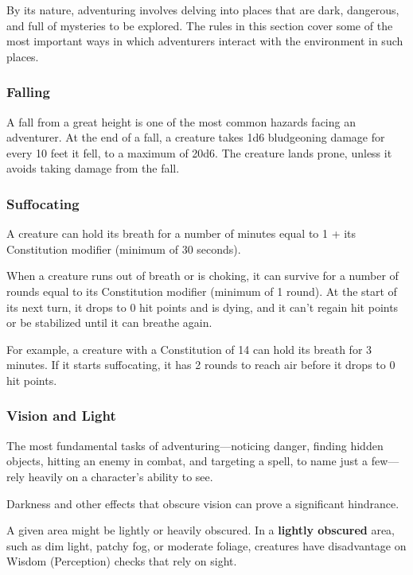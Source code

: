 \documentclass[
]{article}
\begin{document}
By its nature, adventuring involves delving into places that are dark,
dangerous, and full of mysteries to be explored. The rules in this
section cover some of the most important ways in which adventurers
interact with the environment in such places.

\hypertarget{falling}{%
\subsubsection{Falling}\label{falling}}

A fall from a great height is one of the most common hazards facing an
adventurer. At the end of a fall, a creature takes 1d6 bludgeoning
damage for every 10 feet it fell, to a maximum of 20d6. The creature
lands prone, unless it avoids taking damage from the fall.

\hypertarget{suffocating}{%
\subsubsection{Suffocating}\label{suffocating}}

A creature can hold its breath for a number of minutes equal to 1 + its
Constitution modifier (minimum of 30 seconds).

When a creature runs out of breath or is choking, it can survive for a
number of rounds equal to its Constitution modifier (minimum of 1
round). At the start of its next turn, it drops to 0 hit points and is
dying, and it can't regain hit points or be stabilized until it can
breathe again.

For example, a creature with a Constitution of 14 can hold its breath
for 3 minutes. If it starts suffocating, it has 2 rounds to reach air
before it drops to 0 hit points.

\hypertarget{vision-and-light}{%
\subsubsection{Vision and Light}\label{vision-and-light}}

The most fundamental tasks of adventuring---noticing danger, finding
hidden objects, hitting an enemy in combat, and targeting a spell, to
name just a few---rely heavily on a character's ability to see.

Darkness and other effects that obscure vision can prove a significant
hindrance.

A given area might be lightly or heavily obscured. In a \textbf{lightly
obscured} area, such as dim light, patchy fog, or moderate foliage,
creatures have disadvantage on Wisdom (Perception) checks that rely on
sight.
\end{document}
